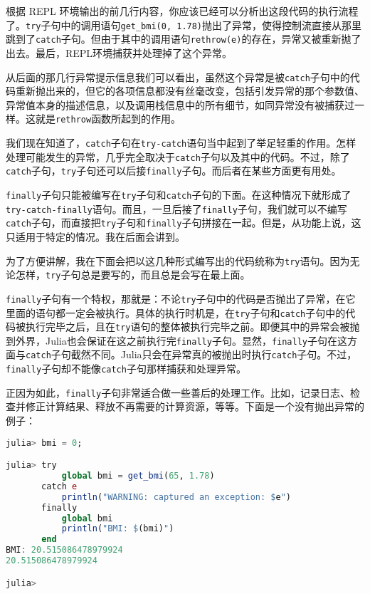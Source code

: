 根据 REPL 环境输出的前几行内容，你应该已经可以分析出这段代码的执行流程了。\verb|try|子句中的调用语句\verb|get_bmi(0, 1.78)|抛出了异常，使得控制流直接从那里跳到了\verb|catch|子句。但由于其中的调用语句\verb|rethrow(e)|的存在，异常又被重新抛了出去。最后，REPL环境捕获并处理掉了这个异常。

从后面的那几行异常提示信息我们可以看出，虽然这个异常是被\verb|catch|子句中的代码重新抛出来的，但它的各项信息都没有丝毫改变，包括引发异常的那个参数值、异常值本身的描述信息，以及调用栈信息中的所有细节，如同异常没有被捕获过一样。这就是\verb|rethrow|函数所起到的作用。

我们现在知道了，\verb|catch|子句在\verb|try-catch|语句当中起到了举足轻重的作用。怎样处理可能发生的异常，几乎完全取决于\verb|catch|子句以及其中的代码。不过，除了\verb|catch|子句，\verb|try|子句还可以后接\verb|finally|子句。而后者在某些方面更有用处。

\verb|finally|子句只能被编写在\verb|try|子句和\verb|catch|子句的下面。在这种情况下就形成了\verb|try-catch-finally|语句。而且，一旦后接了\verb|finally|子句，我们就可以不编写\verb|catch|子句，而直接把\verb|try|子句和\verb|finally|子句拼接在一起。但是，从功能上说，这只适用于特定的情况。我在后面会讲到。

为了方便讲解，我在下面会把以这几种形式编写出的代码统称为\verb|try|语句。因为无论怎样，\verb|try|子句总是要写的，而且总是会写在最上面。

\verb|finally|子句有一个特权，那就是：不论\verb|try|子句中的代码是否抛出了异常，在它里面的语句都一定会被执行。具体的执行时机是，在\verb|try|子句和\verb|catch|子句中的代码被执行完毕之后，且在\verb|try|语句的整体被执行完毕之前。即便其中的异常会被抛到外界，Julia也会保证在这之前执行完\verb|finally|子句。显然，\verb|finally|子句在这方面与\verb|catch|子句截然不同。Julia只会在异常真的被抛出时执行\verb|catch|子句。不过，\verb|finally|子句却不能像\verb|catch|子句那样捕获和处理异常。

正因为如此，\verb|finally|子句非常适合做一些善后的处理工作。比如，记录日志、检查并修正计算结果、释放不再需要的计算资源，等等。下面是一个没有抛出异常的例子：

\begin{lstlisting}[language=julia]
julia> bmi = 0;

julia> try 
           global bmi = get_bmi(65, 1.78)
       catch e
           println("WARNING: captured an exception: $e")
       finally
           global bmi
           println("BMI: $(bmi)")
       end
BMI: 20.515086478979924
20.515086478979924

julia> 
\end{lstlisting}

